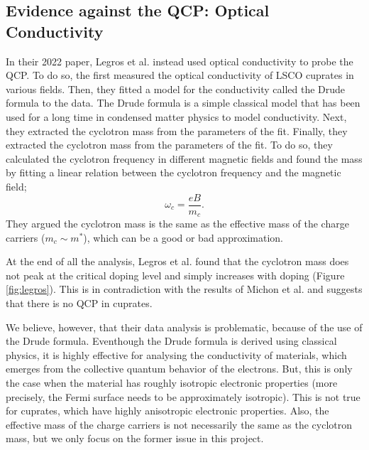 \subsection{Evidence against the QCP: Optical Conductivity}
In their 2022 paper, Legros et al.\cite{legros2022} instead used optical conductivity to
probe the QCP. To do so, the first measured the optical conductivity of LSCO cuprates in various
fields. Then, they fitted a model for the conductivity called the Drude formula to the data. The
Drude formula is a simple classical model that has been used for a long time in condensed matter
physics to model conductivity. Next, they extracted the cyclotron mass from the parameters of the
fit. Finally, they extracted the cyclotron mass from the parameters of the fit. To do so, they
calculated the cyclotron frequency in different magnetic fields and found the mass by fitting a
linear relation between the cyclotron frequency and the magnetic field;
\begin{equation}
    \omega_c = \frac{eB}{m_c}.
\end{equation}
They argued the cyclotron mass is the same as the effective mass of the charge carriers
($m_c \sim m^*$), which can be a good or bad approximation.

At the end of all the analysis, Legros et al. found that the cyclotron mass does not peak
at the critical doping level and simply increases with doping (Figure \ref{fig:legros}). This is in contradiction with the
results of Michon et al. and suggests that there is no QCP in cuprates.

We believe, however, that their data analysis is problematic, because of the use of the Drude
formula. Eventhough the Drude formula is derived using classical physics, it is highly effective for
analysing the conductivity of materials, which emerges from the collective quantum behavior of the
electrons. But, this is only the case when the material has roughly isotropic electronic properties
(more precisely, the Fermi surface needs to be approximately isotropic). This is not true for
cuprates, which have highly anisotropic electronic properties. Also, the effective mass of the
charge carriers is not necessarily the same as the cyclotron mass, but we only focus on the former
issue in this project.
